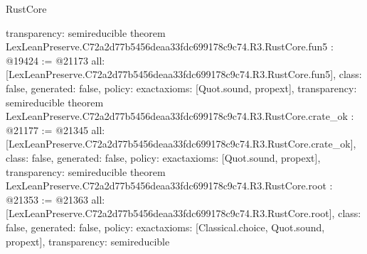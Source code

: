\begin{lexlean}{RustCore}
\begin{coremodule}
{  transparency: semireducible
}
theorem LexLeanPreserve.C72a2d77b5456deaa33fdc699178c9c74.R3.RustCore.fun5 : @19424 := @21173 {
  all: [LexLeanPreserve.C72a2d77b5456deaa33fdc699178c9c74.R3.RustCore.fun5],
  class: false,
  generated: false,
  policy: exact{axioms: [Quot.sound, propext]},
  transparency: semireducible
}
theorem LexLeanPreserve.C72a2d77b5456deaa33fdc699178c9c74.R3.RustCore.crate_ok : @21177 := @21345 {
  all: [LexLeanPreserve.C72a2d77b5456deaa33fdc699178c9c74.R3.RustCore.crate_ok],
  class: false,
  generated: false,
  policy: exact{axioms: [Quot.sound, propext]},
  transparency: semireducible
}
theorem LexLeanPreserve.C72a2d77b5456deaa33fdc699178c9c74.R3.RustCore.root : @21353 := @21363 {
  all: [LexLeanPreserve.C72a2d77b5456deaa33fdc699178c9c74.R3.RustCore.root],
  class: false,
  generated: false,
  policy: exact{axioms: [Classical.choice, Quot.sound, propext]},
  transparency: semireducible
}


\end{coremodule}
\end{lexlean}
